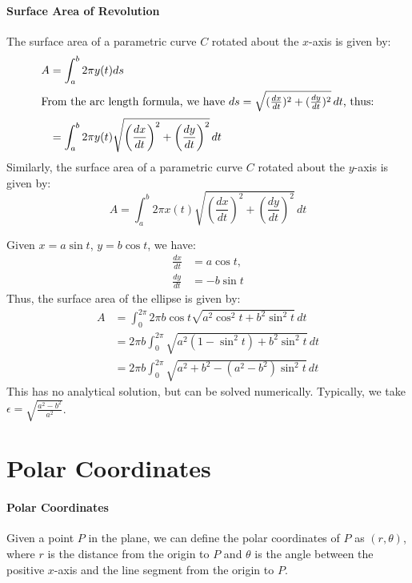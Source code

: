 \documentclass[11pt]{article}
\begin{document}
\paragraph{Surface Area of Revolution} The surface area of a parametric curve $C$ rotated about the $x$-axis is given by:
\begin{align}
    A &= \int_a^b 2\pi y(t) ds \nonumber \\
    \intertext{From the arc length formula, we have $ds = \sqrt{(\frac{dx}{dt})^2 + (\frac{dy}{dt})^2} \, dt$, thus:}
    &= \int_a^b 2\pi y(t) \sqrt{\left(\frac{dx}{dt}\right)^2 + \left(\frac{dy}{dt}\right)^2} \, dt
\end{align}
Similarly, the surface area of a parametric curve $C$ rotated about the $y$-axis is given by:
\begin{equation}
    A = \int_a^b 2\pi x(t) \sqrt{\left(\frac{dx}{dt}\right)^2 + \left(\frac{dy}{dt}\right)^2} \, dt
\end{equation}
\begin{example}
    Given $x = a\sin t$, $y = b\cos t$, we have:
    \begin{align*}
        \frac{dx}{dt} &= a\cos t, \\
        \frac{dy}{dt} &= -b\sin t
    \end{align*}
    Thus, the surface area of the ellipse is given by:
    \begin{align*}
        A &= \int_0^{2\pi} 2\pi b\cos t \sqrt{a^2\cos^2 t + b^2\sin^2 t} \, dt \\
        &= 2\pi b \int_0^{2\pi} \sqrt{a^2 (1 - \sin^2 t) + b^2 \sin^2 t} \, dt \\
        &= 2\pi b \int_0^{2\pi} \sqrt{a^2 + b^2 - (a^2 - b^2)\sin^2 t} \, dt
    \end{align*}
    This has no analytical solution, but can be solved numerically. Typically, we take $\epsilon = \sqrt{\frac{a^2-b^2}{a^2}}$.
\end{example}
\section{Polar Coordinates}
\paragraph{Polar Coordinates} Given a point $P$ in the plane, we can define the polar coordinates of $P$ as $(r, \theta)$, where $r$ is the distance from the origin to $P$ and $\theta$ is the angle between the positive $x$-axis and the line segment from the origin to $P$.
\end{document}
